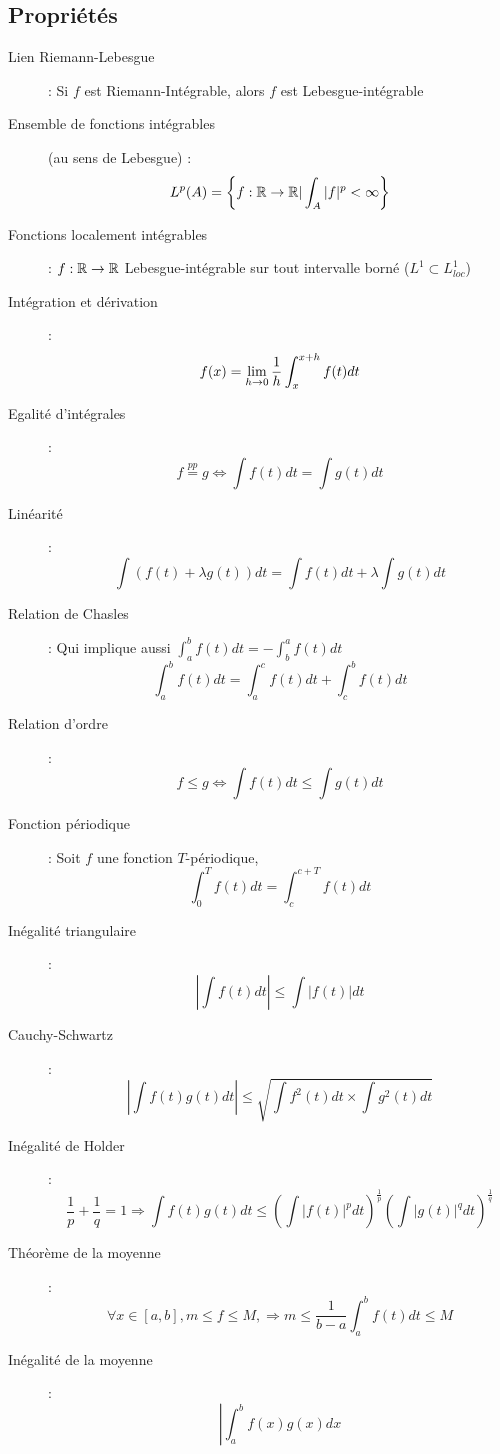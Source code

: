 \subsection{Propriétés}
\begin{description}
\item[Lien Riemann-Lebesgue] : Si $f$ est Riemann-Intégrable, alors $f$ est Lebesgue-intégrable
\item[Ensemble de fonctions intégrables] (au sens de Lebesgue) :
    \[
        L^p(A) = \left\{
            f:\mathbb{R}\rightarrow\mathbb{R} |
            \int_A |f|^p<\infty    
        \right\}
    \]
\item[Fonctions localement intégrables] : $f:\mathbb{R}\rightarrow\mathbb{R}$ Lebesgue-intégrable sur tout intervalle borné ($L^1\subset L^1_{loc}$)
\item[Intégration et dérivation] :
    \[
        f(x)=\lim_{h\rightarrow0}
        \frac{1}{h}
        \int_x^{x+h}f(t)dt
    \]
\item[Egalité d’intégrales] : 
    \[
        f\overset{pp}{=}g\Leftrightarrow
        \int f(t)dt=\int g(t)dt
    \]
\item[Linéarité] : 
    \[ \int (f(t)+\lambda g(t))dt=\int f(t)dt + \lambda\int g(t)dt \]
\item[Relation de Chasles] : Qui implique aussi $\int_a^bf(t)dt=-\int_b^af(t)dt$
    \[ \int_a^bf(t)dt=\int_a^cf(t)dt+\int_c^bf(t)dt \]
\item[Relation d'ordre] : 
    \[ f\le g\Leftrightarrow\int f(t)dt\le\int g(t)dt \]
\item[Fonction périodique] : Soit $f$ une fonction $T$-périodique,
    \[ \int_0^Tf(t)dt=\int_c^{c+T}f(t)dt \]
\item[Inégalité triangulaire] :
    \[ \left|\int f(t)dt\right|\le\int|f(t)|dt \]
\item[Cauchy-Schwartz] : 
    \[
        \left|
        \int f(t)g(t)dt
        \right|\le
        \sqrt{
            \int f^2(t)dt
            \times
            \int g^2(t)dt
        }
    \]
\item[Inégalité de Holder] :
    \[
        \frac{1}{p}+\frac{1}{q}=1
        \Rightarrow
        \int f(t)g(t)dt \le
        \left( \int |f(t)|^pdt \right)^{\frac{1}{p}}
        \left( \int |g(t)|^qdt \right)^{\frac{1}{q}}
    \]
\item[Théorème de la moyenne] :
    \[
        \forall x\in[a,b], m\le f\le M,\Rightarrow
        m\le\frac{1}{b-a}\int_a^bf(t)dt\le M
    \]
\item[Inégalité de la moyenne] :
    \[
        \left|
            \int_a^bf(x)g(x)dx
\]
\end{description}
